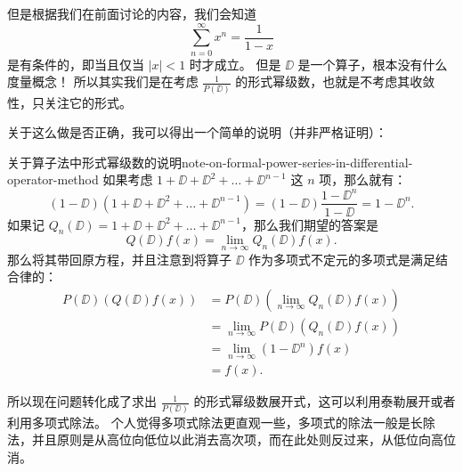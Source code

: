 但是根据我们在前面讨论的内容，我们会知道
\begin{equation}
    \sum_{n=0}^{\infty} x^n = \frac{1}{1 - x}
\end{equation}
是有条件的，即当且仅当 $ |x| < 1 $ 时才成立。
但是 $ \DD $ 是一个算子，根本没有什么度量概念！
所以其实我们是在考虑 $ \frac{1}{P (\DD)} $ 的形式幂级数，也就是不考虑其收敛性，只关注它的形式。

关于这么做是否正确，我可以得出一个简单的说明（并非严格证明）：
\begin{note}{关于算子法中形式幂级数的说明}{note-on-formal-power-series-in-differential-operator-method}
    如果考虑 $ 1 + \DD + \DD^2 + \ldots + \DD^{n - 1} $ 这 $ n $ 项，那么就有：
    \begin{equation*}
        (1 - \DD)(1 + \DD + \DD^2 + \ldots + \DD^{n - 1}) = (1 - \DD) \frac{1 - \DD^n}{1 - \DD} = 1 - \DD^n .
    \end{equation*}
    如果记 $ Q_n (\DD) = 1 + \DD + \DD^2 + \ldots + \DD^{n - 1} $，那么我们期望的答案是
    \begin{equation*}
        Q (\DD) f(x) = \lim_{n \to \infty} Q_n (\DD) f(x) .
    \end{equation*}
    那么将其带回原方程，并且注意到将算子 $ \DD $ 作为多项式不定元的多项式是满足结合律的：
    \begin{equation*}
        \begin{aligned}
            P(\DD)(Q(\DD) f(x)) & = P(\DD) \left( \lim_{n \to \infty} Q_n (\DD) f(x) \right) \\
                                & = \lim_{n \to \infty} P(\DD) (Q_n (\DD) f(x))              \\
                                & = \lim_{n \to \infty} (1 - \DD^n) f(x)                     \\
                                & = f(x).
        \end{aligned}
    \end{equation*}

    所以现在问题转化成了求出 $ \frac{1}{P(\DD)} $ 的形式幂级数展开式，这可以利用泰勒展开或者利用多项式除法。
    个人觉得多项式除法更直观一些，多项式的除法一般是长除法，并且原则是从高位向低位以此消去高次项，而在此处则反过来，从低位向高位消。


\end{note}
